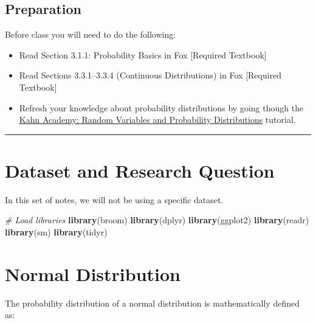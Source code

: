 \documentclass[]{book}
\newenvironment{Shaded}{\begin{snugshade}}{\end{snugshade}}
\newcommand{\CommentTok}[1]{\textcolor[rgb]{0.56,0.35,0.01}{\textit{#1}}}
\newcommand{\KeywordTok}[1]{\textcolor[rgb]{0.13,0.29,0.53}{\textbf{#1}}}
\newcommand{\NormalTok}[1]{#1}
\begin{document}
\hypertarget{preparation-3}{%
\subsection*{Preparation}\label{preparation-3}}

Before class you will need to do the following:

\begin{itemize}
\item
  Read Section 3.1.1: Probability Basics in Fox {[}Required Textbook{]}
\item
  Read Sections 3.3.1--3.3.4 (Continuous Distributions) in Fox {[}Required Textbook{]}
\item
  Refresh your knowledge about probability distributions by going though the \href{https://www.khanacademy.org/math/probability/random-variables-topic}{Kahn Academy: Random Variables and Probability Distributions} tutorial.
\end{itemize}

\begin{center}\rule{0.5\linewidth}{\linethickness}\end{center}

\hypertarget{dataset-and-research-question-2}{%
\section{Dataset and Research Question}\label{dataset-and-research-question-2}}

In this set of notes, we will not be using a specific dataset.

\begin{Shaded}
\begin{Highlighting}[]
\CommentTok{# Load libraries}
\KeywordTok{library}\NormalTok{(broom)}
\KeywordTok{library}\NormalTok{(dplyr)}
\KeywordTok{library}\NormalTok{(ggplot2)}
\KeywordTok{library}\NormalTok{(readr)}
\KeywordTok{library}\NormalTok{(sm)}
\KeywordTok{library}\NormalTok{(tidyr)}
\end{Highlighting}
\end{Shaded}

\hypertarget{normal-distribution}{%
\section{Normal Distribution}\label{normal-distribution}}

The probability distribution of a normal distribution is mathematically defined as:
\end{document}
